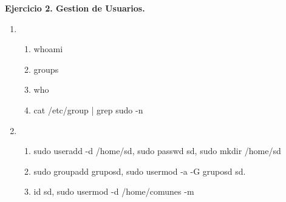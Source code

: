 \documentclass{article}
\begin{document}
\textbf{Ejercicio 2. Gestion de Usuarios.}
\begin{enumerate}
    \item
        \begin{enumerate}
            \item whoami
            \item groups
            \item who
            \item cat /etc/group | grep sudo -n
        \end{enumerate}
    \item
        \begin{enumerate}
            \item sudo useradd -d /home/sd, sudo passwd sd, sudo mkdir /home/sd
            \item sudo groupadd gruposd, sudo usermod -a -G gruposd sd.
            \item id sd, sudo usermod -d /home/comunes -m
        \end{enumerate}
\end{enumerate}
\end{document}
